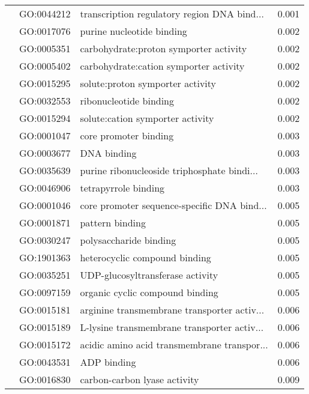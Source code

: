 \begin{longtable}{lllr}
   & GO:0044212 &  transcription regulatory region DNA bind... &         0.001 \\
   & GO:0017076 &                    purine nucleotide binding &         0.002 \\
   & GO:0005351 &       carbohydrate:proton symporter activity &         0.002 \\
   & GO:0005402 &       carbohydrate:cation symporter activity &         0.002 \\
   & GO:0015295 &             solute:proton symporter activity &         0.002 \\
   & GO:0032553 &                       ribonucleotide binding &         0.002 \\
   & GO:0015294 &             solute:cation symporter activity &         0.002 \\
   & GO:0001047 &                        core promoter binding &         0.003 \\
   & GO:0003677 &                                  DNA binding &         0.003 \\
   & GO:0035639 &  purine ribonucleoside triphosphate bindi... &         0.003 \\
   & GO:0046906 &                         tetrapyrrole binding &         0.003 \\
   & GO:0001046 &  core promoter sequence-specific DNA bind... &         0.005 \\
   & GO:0001871 &                              pattern binding &         0.005 \\
   & GO:0030247 &                       polysaccharide binding &         0.005 \\
   & GO:1901363 &                heterocyclic compound binding &         0.005 \\
   & GO:0035251 &             UDP-glucosyltransferase activity &         0.005 \\
   & GO:0097159 &              organic cyclic compound binding &         0.005 \\
   & GO:0015181 &  arginine transmembrane transporter activ... &         0.006 \\
   & GO:0015189 &  L-lysine transmembrane transporter activ... &         0.006 \\
   & GO:0015172 &  acidic amino acid transmembrane transpor... &         0.006 \\
   & GO:0043531 &                                  ADP binding &         0.006 \\
   & GO:0016830 &                 carbon-carbon lyase activity &         0.009 \\

\end{longtable}
